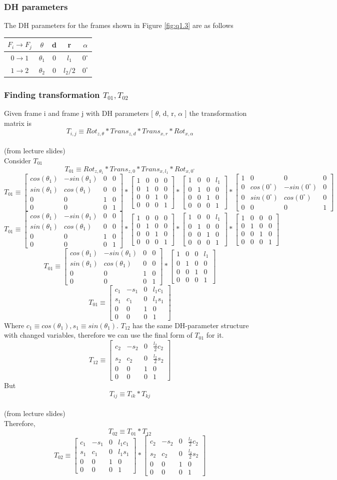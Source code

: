 \documentclass[12pt]{article}
\newcommand{\fromlectures}{{\\ \color{blue} \hspace*{\fill}(from lecture slides)} \\}
\newcommand{\rx}[1]{\begin{bmatrix} 1 & 0 & 0 & 0 \\ 0 & cos(#1) & -sin(#1) & 0 \\ 0 & sin(#1) & cos(#1) & 0 \\ 0 & 0 & 0 & 1 \end{bmatrix}}
\newcommand{\rz}[1]{\begin{bmatrix} cos(#1) & -sin(#1) & 0 & 0 \\ sin(#1) & cos(#1) & 0 & 0 \\ 0 & 0 & 1 & 0 \\ 0 & 0 & 0 & 1 \end{bmatrix}}
\newcommand{\iden}{\begin{bmatrix} 1 & 0 & 0 & 0 \\ 0 & 1 & 0 & 0 \\ 0 & 0 & 1 & 0 \\ 0 & 0 & 0 & 1 \end{bmatrix}}
\newcommand{\trans}[3]{\begin{bmatrix} 1 & 0 & 0 & #1 \\ 0 & 1 & 0 & #2 \\ 0 & 0 & 1 & #3 \\ 0 & 0 & 0 & 1 \end{bmatrix}}
\begin{document}
\subsubsection*{DH parameters}
The DH parameters for the frames shown in Figure \ref{fig:q1.3} are as follows
\begin{center}
\begin{tabular}{ c | c c c c }
 \hline
 $F_i \to F_j$ & $\theta$ & d & r & $\alpha$ \\
 \hline
 $0 \to 1$ & $\theta_1$ & 0 & $l_1$ & $0^{\circ}$ \\
 $1 \to 2$ & $\theta_2$ & 0 & $l_2 / 2$ & $0^{\circ}$ \\
 \hline
\end{tabular}
\end{center}

\subsubsection*{Finding transformation $T_{01}, T_{02}$}
Given frame i and frame j with DH parameters [ $\theta$, d, r, $\alpha$ ] the transformation matrix is
\[
  T_{i,j} \equiv Rot_{z,\theta} * Trans_{z, d} * Trans_{x, r} * Rot_{x, \alpha}
\]
\fromlectures
Consider $T_{01}$
\[
  T_{01} \equiv Rot_{z,\theta_1} * Trans_{z, 0} * Trans_{x, l_1} * Rot_{x, 0^{\circ}}
\]
\[
  T_{01} \equiv \rz{\theta_1} * \trans{0}{0}{0} * \trans{l_1}{0}{0} * \rx{0^{\circ}}
\]
\[
  T_{01} \equiv \rz{\theta_1} * \iden * \trans{l_1}{0}{0} * \iden
\]
\[
  T_{01} \equiv \rz{\theta_1} * \trans{l_1}{0}{0}
\]
\[
  T_{01} \equiv
  \begin{bmatrix} c_1 & -s_1 & 0 & l_1c_1 \\ s_1 & c_1 & 0 & l_1s_1 \\ 0 & 0 & 1 & 0 \\ 0 & 0 & 0 & 1 \end{bmatrix}
\]
Where $c_1 \equiv cos(\theta_1), s_1 \equiv sin(\theta_1)$.
$T_{12}$ has the same DH-parameter structure with changed variables, therefore we can use the final form of $T_{01}$ for it.
\[
  T_{12} \equiv
  \begin{bmatrix} c_2 & -s_2 & 0 & \frac{l_2}{2}c_2 \\ s_2 & c_2 & 0 & \frac{l_2}{2}s_2 \\ 0 & 0 & 1 & 0 \\ 0 & 0 & 0 & 1 \end{bmatrix}
\]
But
\[
  T_{ij} \equiv T_{ik} * T_{kj}
\]
\fromlectures
Therefore,
\[
  T_{02} \equiv T_{01} * T_{12}
\]
\[
  T_{02} \equiv
  \begin{bmatrix} c_1 & -s_1 & 0 & l_1c_1 \\ s_1 & c_1 & 0 & l_1s_1 \\ 0 & 0 & 1 & 0 \\ 0 & 0 & 0 & 1 \end{bmatrix}
  *
  \begin{bmatrix} c_2 & -s_2 & 0 & \frac{l_2}{2}c_2 \\ s_2 & c_2 & 0 & \frac{l_2}{2}s_2 \\ 0 & 0 & 1 & 0 \\ 0 & 0 & 0 & 1 \end{bmatrix}
\]
\end{document}
